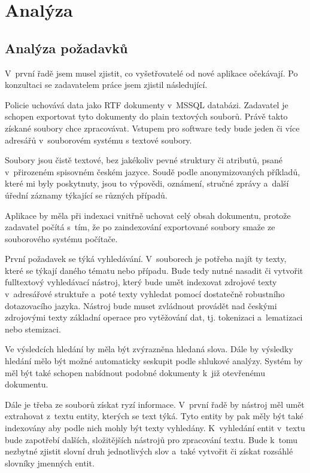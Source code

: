 \chapter{Analýza}
\label{analysis}
\section{Analýza požadavků}
V~první řadě jsem musel zjistit, co vyšetřovatelé od nové aplikace očekávají. Po konzultaci se zadavatelem práce jsem zjistil následující. 

Policie uchovává data jako RTF dokumenty v~MSSQL databázi. Zadavatel je schopen exportovat tyto dokumenty do plain textových souborů. Právě takto získané soubory chce zpracovávat. Vstupem pro software tedy bude jeden či více adresářů v~souborovém systému s textové soubory.

Soubory jsou čistě textové, bez jakékoliv pevné struktury či atributů, psané v~přirozeném spisovném českém jazyce. Soudě podle anonymizovaných příkladů, které mi byly poskytnuty, jsou to výpovědi, oznámení, stručné zprávy a~další úřední záznamy týkající se různých případů.

Aplikace by měla při indexaci vnitřně uchovat celý obsah dokumentu, protože zadavatel počítá s~tím, že po zaindexování exportované soubory smaže ze souborového systému počítače.

První požadavek se týká vyhledávání. V~souborech je potřeba najít ty texty, které se týkají daného tématu nebo případu. Bude tedy nutné nasadit či vytvořit fulltextový vyhledávací nástroj, který bude umět indexovat zdrojové texty v~adresářové struktuře a~poté texty vyhledat pomocí dostatečně robustního dotazovacího jazyka. Nástroj bude muset zvládnout provádět nad českými zdrojovými texty základní operace pro vytěžování dat, tj. tokenizaci a~lematizaci nebo stemizaci.

Ve výsledcích hledání by měla být zvýrazněna hledaná slova. Dále by výsledky hledání mělo být možné automaticky seskupit podle shlukové analýzy. Systém by měl být také schopen nabídnout podobné dokumenty k~již otevřenému dokumentu.

Dále je třeba ze souborů získat ryzí informace. V~první řadě by nástroj měl umět extrahovat z~textu entity, kterých se text týká. Tyto entity by pak měly být také indexovány aby podle nich mohly být texty vyhledány. K~vyhledání entit v~textu bude zapotřebí dalších, složitějších nástrojů pro zpracování textu. Bude k~tomu nezbytné zjistit slovní druh jednotlivých slov a~také vytvořit či získat rozsáhlé slovníky jmenných entit. 

